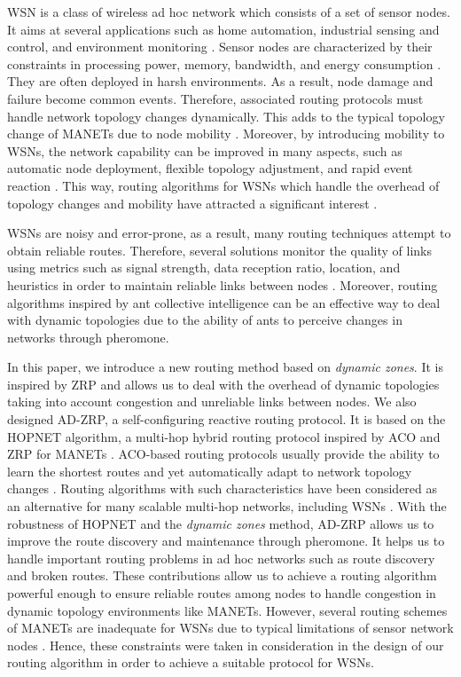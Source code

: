 \documentclass[conference]{IEEEtran}
\begin{document}
WSN is a class of wireless ad hoc network which consists of a set of sensor nodes.
It aims at several applications such as home automation, industrial sensing and control, and environment monitoring \cite{Shuang:2009}.
Sensor nodes are characterized by their constraints in processing power, memory, bandwidth, and energy consumption \cite{Matrouk:2009}.
They are often deployed in harsh environments.
As a result, node damage and failure become common events.
Therefore, associated routing protocols must handle network topology changes dynamically.
This adds to the typical topology change of MANETs due to node mobility \cite{Garcia:2007}.
Moreover, by introducing mobility to WSNs, the network capability can be improved in many aspects, such as automatic node deployment, flexible topology adjustment, and rapid event reaction \cite{Wang:2010}.
This way, routing algorithms for WSNs which handle the overhead of topology changes and mobility have attracted a significant interest \cite{Akkaya:2005}.

WSNs are noisy and error-prone, as a result, many routing techniques attempt to obtain reliable routes.
Therefore, several solutions monitor the quality of links using metrics such as signal strength, data reception ratio, location, and heuristics in order to maintain reliable links between nodes \cite{Stankovic:2008}.
Moreover, routing algorithms inspired by ant collective intelligence can be an effective way to deal with dynamic topologies due to the ability of ants to perceive changes in networks through pheromone.

In this paper, we introduce a new routing method based on \emph{dynamic zones}.
It is inspired by ZRP and allows us to deal with the overhead of dynamic topologies taking into account congestion and unreliable links between nodes.
We also designed AD-ZRP, a self-configuring reactive routing protocol.
It is based on the HOPNET algorithm, a multi-hop hybrid routing protocol inspired by ACO and ZRP for MANETs \cite{Wang:2009}.
ACO-based routing protocols usually provide the ability to learn the shortest routes \cite{Lu:2004} and yet automatically adapt to network topology changes \cite{Iyengar:2007}.
Routing algorithms with such characteristics have been considered as an alternative for many scalable multi-hop networks, including WSNs \cite{Okdem:2009, Dhurandher:2009}.
With the robustness of HOPNET and the \emph{dynamic zones} method, AD-ZRP allows us to improve the route discovery and maintenance through pheromone.
It helps us to handle important routing problems in ad hoc networks such as route discovery and broken routes.
These contributions allow us to achieve a routing algorithm powerful enough to ensure reliable routes among nodes to handle congestion in dynamic topology environments like MANETs.
However, several routing schemes of MANETs are inadequate for WSNs due to typical limitations of sensor network nodes \cite{Okdem:2009}.
Hence, these constraints were taken in consideration in the design of our routing algorithm in order to achieve a suitable protocol for WSNs.
\end{document}
